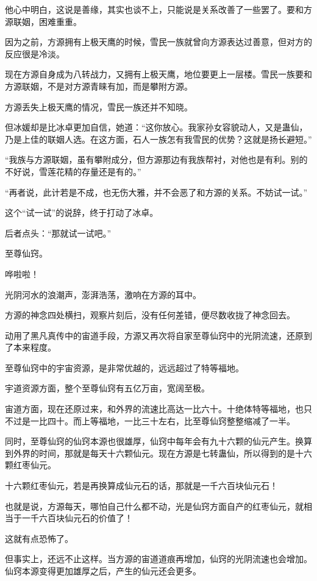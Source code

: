 \begin{this_body}
他心中明白，这说是善缘，其实也谈不上，只能说是关系改善了一些罢了。要和方源联姻，困难重重。

因为之前，方源拥有上极天鹰的时候，雪民一族就曾向方源表达过善意，但对方的反应很是冷淡。

现在方源自身成为八转战力，又拥有上极天鹰，地位要更上一层楼。雪民一族要和方源联姻，不是对方源青睐有加，而是攀附方源。

方源丢失上极天鹰的情况，雪民一族还并不知晓。

但冰媛却是比冰卓更加自信，她道：“这你放心。我家孙女容貌动人，又是蛊仙，乃是上佳的联姻人选。在这方面，石人一族怎有我雪民的优势？这就是扬长避短。”

“我族与方源联姻，虽有攀附成分，但方源那边有我族帮衬，对他也是有利。别的不好说，雪莲花精的存量还是有的。”

“再者说，此计若是不成，也无伤大雅，并不会恶了和方源的关系。不妨试一试。”

这个“试一试”的说辞，终于打动了冰卓。

后者点头：“那就试一试吧。”

至尊仙窍。

哗啦啦！

光阴河水的浪潮声，澎湃浩荡，激响在方源的耳中。

方源的神念四处横扫，观察片刻后，没有任何差错，便尽数收拢了神念回去。

动用了黑凡真传中的宙道手段，方源又再次将自家至尊仙窍中的光阴流速，还原到了本来程度。

至尊仙窍中的宇宙资源，是非常优越的，远远超过了特等福地。

宇道资源方面，整个至尊仙窍有五亿万亩，宽阔至极。

宙道方面，现在还原过来，和外界的流速比高达一比六十。十绝体特等福地，也只不过是一比四十。而上等福地，一比三十左右，比至尊仙窍整整缩减了一半。

同时，至尊仙窍的仙窍本源也很雄厚，仙窍中每年会有九十六颗的仙元产生。换算到外界的时间，那就是每天十六颗仙元。现在方源是七转蛊仙，所以得到的是十六颗红枣仙元。

十六颗红枣仙元，若是再换算成仙元石的话，那就是一千六百块仙元石！

也就是说，方源每天，哪怕自己什么都不动，光是仙窍方面自产的红枣仙元，就相当于一千六百块仙元石的价值了！

这就有点恐怖了。

但事实上，还远不止这样。当方源的宙道道痕再增加，仙窍的光阴流速也会增加。仙窍本源变得更加雄厚之后，产生的仙元还会更多。


\end{this_body}
